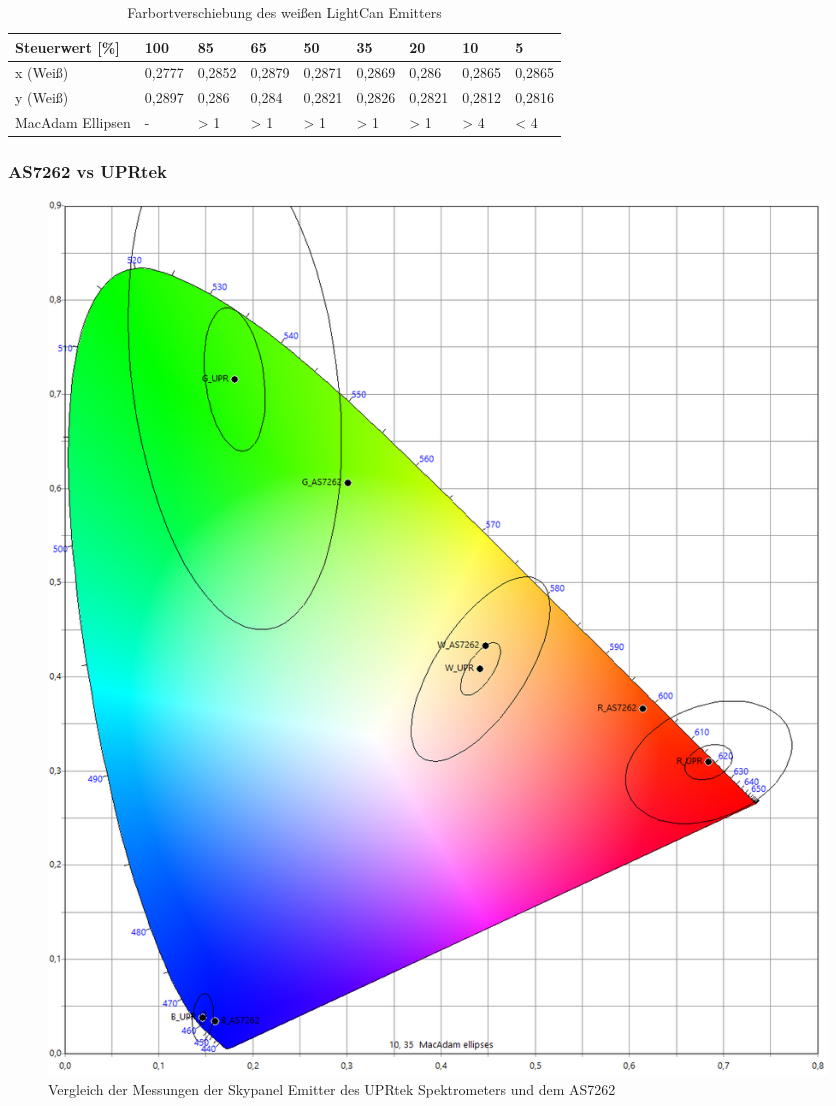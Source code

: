 \documentclass[11pt]{scrartcl}
\begin{document}
\noindent
\begin{table}[H]
    \begin{tabularx}{\textwidth}{|l|X|X|X|X|X|X|X|X|}
        \hline
        Steuerwert [\%]  & 100    & 85     & 65     & 50     & 35     & 20     & 10     & 5      \\\hline
        x (Weiß)         & 0,2777 & 0,2852 & 0,2879 & 0,2871 & 0,2869 & 0,286  & 0,2865 & 0,2865 \\\hline
        y (Weiß)         & 0,2897 & 0,286  & 0,284  & 0,2821 & 0,2826 & 0,2821 & 0,2812 & 0,2816 \\\hline
        MacAdam Ellipsen & -      & > 1    & > 1    & > 1    & > 1    & > 1    & > 4    & < 4    \\\hline
    \end{tabularx}
    \caption{Farbortverschiebung des weißen LightCan Emitters} \label{table:whiteEmitterLightCan}
\end{table}
\noindent
\clearpage

\subsubsection{AS7262 vs UPRtek}
\begin{figure}[H]
    \begin{center}
        \includegraphics[width=.8\textwidth]{images/macAdam/comparison_upr_as7262.png}
    \end{center}
    \caption{Vergleich der Messungen der Skypanel Emitter des UPRtek Spektrometers und dem AS7262} \label{compareUPRtekAS7262}
\end{figure}
\clearpage
\end{document}
